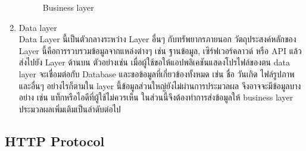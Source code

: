 \documentclass[14pt,oneside,openright,a4paper]{cpe-thai-project}
\begin{document}
\begin{enumerate}
      \begin{figure}[!h]\centering
        \setlength{\fboxrule}{0.5mm} %
        \setlength{\fboxsep}{0.4cm}
        \caption{Business layer \cite{BusinessLayer}}\label{fig:business_layer}
      \end{figure}
\newpage
    \item Data layer \\
          Data Layer \cite{MobileAppArchitecture} นี้เป็นตัวกลางระหว่าง Layer อื่นๆ กับทรัพยากรภายนอก
          วัตถุประสงค์หลักของ Layer นี้คือการรวบรวมข้อมูลจากแหล่งต่างๆ เช่น ฐานข้อมูล, เซิร์ฟเวอร์คลาวด์ หรือ API แล้วส่งไปยัง Layer ด้านบน 
          ตัวอย่างเช่น เมื่อผู้ใช้ขอให้แอปพลิเคชันแสดงโปรไฟล์ของตน data layer จะเชื่อมต่อกับ Database และขอข้อมูลที่เกี่ยวข้องทั้งหมด เช่น ชื่อ วันเกิด ไฟล์รูปภาพ และอื่นๆ อย่างไรก็ตามใน layer นี้ข้อมูลส่วนใหญ่ยังไม่ผ่านการประมวลผล จึงอาจจะมีข้อมูลบางอย่าง เช่น แท็กหรือไอดีที่ผู้ใช้ไม่ควรเห็น ในส่วนนี้จึงต้องทำการส่งข้อมูลให้ business layer ประมวลผลเพิ่มเติมเป็นลำดับต่อไป
    \end{enumerate}

\subsection {HTTP Protocol} 
\end{document}
